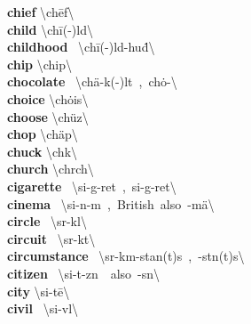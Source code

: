 \documentclass[10pt,a4paper]{article}
\begin{document}
\begin{multicols}{2}
\textbf{ chief }\quad \textbackslash \textprimstress ch\={e}f\textbackslash \\
\textbf{ child }\quad \textbackslash \textprimstress ch\={i}(-\textschwa )ld\textbackslash \\
\textbf{ childhood }\quad \ \textbackslash \textprimstress ch\={i}(-\textschwa )ld-\textsecstress hu\. d\textbackslash \\
\textbf{ chip }\quad \textbackslash \textprimstress chip\textbackslash \\
\textbf{ chocolate }\quad \ \textbackslash \textprimstress ch\"{a}-k(\textschwa -)l\textschwa t\ ,\ \textprimstress ch\.{o}-\textbackslash \\
\textbf{ choice }\quad \textbackslash \textprimstress ch\.{o}is\textbackslash \\
\textbf{ choose }\quad \textbackslash \textprimstress ch\"{u}z\textbackslash \\
\textbf{ chop }\quad \textbackslash \textprimstress ch\"{a}p\textbackslash \\
\textbf{ chuck }\quad \textbackslash \textprimstress ch\textschwa k\textbackslash \\
\textbf{ church }\quad \textbackslash \textprimstress ch\textschwa rch\textbackslash \\
\textbf{ cigarette }\quad \ \textbackslash \textsecstress si-g\textschwa -\textprimstress ret\ ,\ \textprimstress si-g\textschwa -\textsecstress ret\textbackslash \\
\textbf{ cinema }\quad \ \textbackslash \textprimstress si-n\textschwa -m\textschwa \ ,\ British\ also\ -\textsecstress m\"{a}\textbackslash \\
\textbf{ circle }\quad \ \textbackslash \textprimstress s\textschwa r-k\textschwa l\textbackslash \\
\textbf{ circuit }\quad \ \textbackslash \textprimstress s\textschwa r-k\textschwa t\textbackslash \\
\textbf{ circumstance }\quad \ \textbackslash \textprimstress s\textschwa r-k\textschwa m-\textsecstress stan(t)s\ ,\ -st\textschwa n(t)s\textbackslash \\
\textbf{ citizen }\quad \ \textbackslash \textprimstress si-t\textschwa -z\textschwa n\ \ also\ -s\textschwa n\textbackslash \\
\textbf{ city }\quad \textbackslash \textprimstress si-t\={e}\textbackslash \\
\textbf{ civil }\quad \ \textbackslash \textprimstress si-v\textschwa l\textbackslash \\

\end{multicols}
\end{document}
